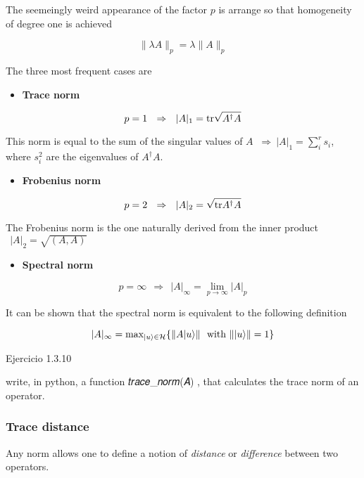 \documentclass[11pt]{article}
\providecommand{\tightlist}{%
      \setlength{\itemsep}{0pt}\setlength{\parskip}{0pt}}
\begin{document}
    

    The seemeingly weird appearance of the factor \(p\) is arrange so that
homogeneity of degree one is achieved

\[
\| \lambda A \|_p = \lambda \| A \|_p
\]

    The three most frequent cases are

\begin{itemize}
\tightlist
\item
  \textbf{Trace norm}
\end{itemize}

\[p=1 ~~\Rightarrow ~~ | A |_1 =  {\rm tr} \sqrt{A^\dagger A}\]

This norm is equal to the sum of the singular values of \(A\)
\(~\Rightarrow ~| A |_1  = \sum_i^r s_i\), where \(s_i^2\) are the
eigenvalues of \(A^\dagger A\).

    \begin{itemize}
\tightlist
\item
  \textbf{Frobenius norm}
\end{itemize}

\[ p=2 ~~\Rightarrow ~~ | A |_2 =  \sqrt{{ \rm tr} A^\dagger A }
\]

The Frobenius norm is the one naturally derived from the inner product
\(~~
|A|_2 = \sqrt{(A,A)}\)

    \begin{itemize}
\tightlist
\item
  \textbf{Spectral norm}
\end{itemize}

\[p=\infty ~~\Rightarrow ~~  | A |_\infty = \lim_{p\to \infty} | A |_p
\]

It can be shown that the spectral norm is equivalent to the following
definition

\[
|A|_\infty = \hbox{max}_{|u\rangle\in {\cal H}}\{ \|A|u\rangle\| ~~\hbox{with} ~ \||u\rangle\| = 1\}
\]

    Ejercicio 1.3.10\(~\)

write, in python, a function 𝑡𝑟𝑎𝑐𝑒\_𝑛𝑜𝑟𝑚(𝐴) , that calculates the trace
norm of an operator.

    \subsubsection{Trace distance}\label{trace-distance}

    Any norm allows one to define a notion of \emph{distance} or
\emph{difference} between two operators.
\end{document}
